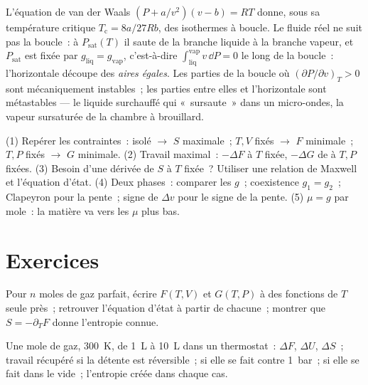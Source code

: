 \begin{remark}\label{rem:b2:thermodynamic-potentials:maxwellconstruction}
L'équation de van der Waals $(P + a/v^2)(v - b) = RT$ donne, sous sa
température critique $T_{\text{c}} = 8a/27Rb$, des isothermes à boucle. Le
fluide réel ne suit pas la boucle~: à $P_{\text{sat}}(T)$ il saute de
la branche liquide à la branche vapeur, et $P_{\text{sat}}$ est fixée par $g_{\text{liq}}
= g_{\text{vap}}$, c'est-à-dire $\int_{\text{liq}}^{\text{vap}}v\,\dd P = 0$ le long de la
boucle~: l'horizontale découpe des \emph{aires égales}. Les parties de la
boucle où $(\partial P/\partial v)_T > 0$ sont mécaniquement instables~; les
parties entre elles et l'horizontale sont métastables --- le liquide surchauffé
qui «~sursaute~» dans un micro-ondes, la vapeur sursaturée de la
chambre à brouillard.
\end{remark}

\begin{method}\label{meth:b2:thermodynamic-potentials:method}
(1) Repérer les contraintes~: isolé $\to$ $S$ maximale~; $T,V$ fixés $\to$
$F$ minimale~; $T,P$ fixés $\to$ $G$ minimale. (2) Travail maximal~: $-\Delta F$ à $T$
fixée, $-\Delta G$ de  à $T,P$ fixées. (3) Besoin d'une dérivée de
$S$ à $T$ fixée~? Utiliser une relation de Maxwell et l'équation d'état.
(4) Deux phases~: comparer les $g$~; coexistence $g_1 = g_2$~; Clapeyron pour la
pente~; signe de $\Delta v$ pour le signe de la pente. (5)  $\mu = g$ par mole~: la matière va vers les $\mu$ plus bas.
\end{method}

\section{Exercices}

\begin{exercise}[$\star$]\label{exo:b2:thermodynamic-potentials:1}
Pour $n$ moles de gaz parfait, écrire $F(T,V)$ et $G(T,P)$ à des
fonctions de $T$ seule près~; retrouver l'équation d'état à partir de chacune~; montrer
que $S = -\partial_TF$ donne l'entropie connue.
\end{exercise}

\begin{exercise}[$\star$]\label{exo:b2:thermodynamic-potentials:2}
Une mole de gaz, \qty{300}{K}, de \qty{1}{L} à \qty{10}{L} dans un
thermostat~: $\Delta F$, $\Delta U$, $\Delta S$~; travail récupéré si la détente est réversible~;
si elle se fait contre \qty{1}{bar}~; si elle se fait dans le vide~; l'entropie créée dans chaque
cas.
\end{exercise}

